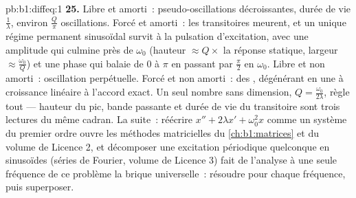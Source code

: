 \begin{solution}{pb:b1:diffeq:1}
\textbf{25.} Libre et amorti~: pseudo-oscillations décroissantes, durée
de vie $\frac1\lambda$, environ $\frac Q\pi$ oscillations. Forcé et
amorti~: les transitoires meurent, et un unique régime permanent
sinusoïdal survit à la pulsation d'excitation, avec une amplitude qui
culmine près de $\omega_0$ (hauteur $\approx Q \times$ la réponse
statique, largeur $\approx \frac{\omega_0}Q$) et une phase qui balaie
de $0$ à $\pi$ en passant par $\frac\pi2$ en $\omega_0$. Libre et non
amorti~: oscillation perpétuelle. Forcé et non amorti~: des
, dégénérant en une  à croissance linéaire à
l'accord exact. Un seul nombre sans dimension, $Q =
\frac{\omega_0}{2\lambda}$, règle tout --- hauteur du pic, bande
passante et durée de vie du transitoire sont trois lectures du même
cadran. La suite~: réécrire $x'' + 2\lambda x' + \omega_0^2x$ comme un
système du premier ordre ouvre les méthodes matricielles du
\cref{ch:b1:matrices} et du volume de Licence 2, et décomposer une
excitation périodique quelconque en sinusoïdes (séries de Fourier,
volume de Licence 3) fait de l'analyse à une seule fréquence de ce
problème la brique universelle~: résoudre pour chaque fréquence, puis
superposer.
\end{solution}
